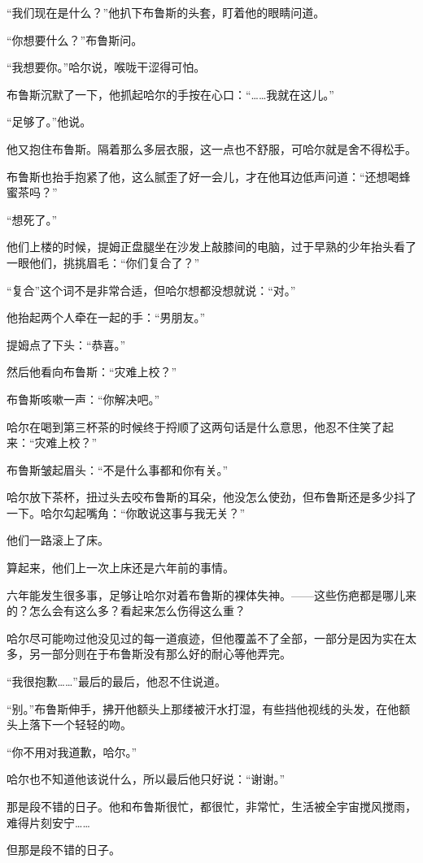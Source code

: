 \documentclass[../main]{subfiles}
\begin{document}
“我们现在是什么？”他扒下布鲁斯的头套，盯着他的眼睛问道。

“你想要什么？”布鲁斯问。

“我想要你。”哈尔说，喉咙干涩得可怕。

布鲁斯沉默了一下，他抓起哈尔的手按在心口：“……我就在这儿。”

“足够了。”他说。

他又抱住布鲁斯。隔着那么多层衣服，这一点也不舒服，可哈尔就是舍不得松手。

布鲁斯也抬手抱紧了他，这么腻歪了好一会儿，才在他耳边低声问道：“还想喝蜂蜜茶吗？”

“想死了。”

他们上楼的时候，提姆正盘腿坐在沙发上敲膝间的电脑，过于早熟的少年抬头看了一眼他们，挑挑眉毛：“你们复合了？”

“复合”这个词不是非常合适，但哈尔想都没想就说：“对。”

他抬起两个人牵在一起的手：“男朋友。”

提姆点了下头：“恭喜。”

然后他看向布鲁斯：“灾难上校？”

布鲁斯咳嗽一声：“你解决吧。”

哈尔在喝到第三杯茶的时候终于捋顺了这两句话是什么意思，他忍不住笑了起来：“灾难上校？”

布鲁斯皱起眉头：“不是什么事都和你有关。”

哈尔放下茶杯，扭过头去咬布鲁斯的耳朵，他没怎么使劲，但布鲁斯还是多少抖了一下。哈尔勾起嘴角：“你敢说这事与我无关？”

他们一路滚上了床。

算起来，他们上一次上床还是六年前的事情。

六年能发生很多事，足够让哈尔对着布鲁斯的裸体失神。——这些伤疤都是哪儿来的？怎么会有这么多？看起来怎么伤得这么重？

哈尔尽可能吻过他没见过的每一道痕迹，但他覆盖不了全部，一部分是因为实在太多，另一部分则在于布鲁斯没有那么好的耐心等他弄完。

“我很抱歉\ldots\ldots”最后的最后，他忍不住说道。

“别。”布鲁斯伸手，拂开他额头上那缕被汗水打湿，有些挡他视线的头发，在他额头上落下一个轻轻的吻。

“你不用对我道歉，哈尔。”

哈尔也不知道他该说什么，所以最后他只好说：“谢谢。”

那是段不错的日子。他和布鲁斯很忙，都很忙，非常忙，生活被全宇宙搅风搅雨，难得片刻安宁……

但那是段不错的日子。
\end{document}
